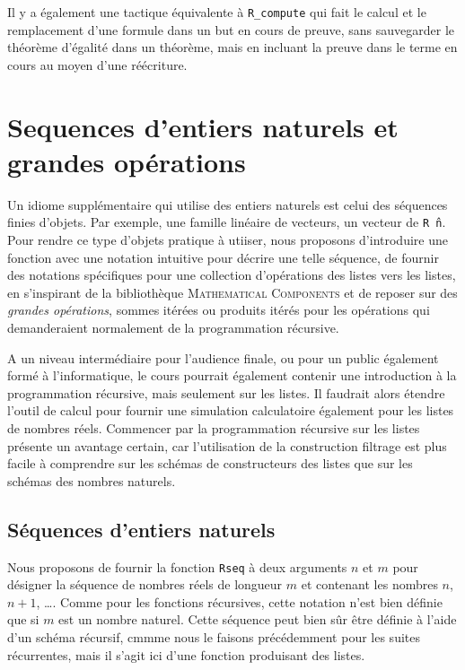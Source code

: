 \documentclass[draft]{jflart}
\newcommand{\mathcomp}{\textsc{Mathematical Components}}
\begin{document}
Il y a également une tactique équivalente à \texttt{R\_compute} qui fait
le calcul et le remplacement d'une formule dans un but en cours de
preuve, sans sauvegarder le théorème d'égalité dans un théorème, mais
en incluant la preuve dans le terme en cours au moyen d'une réécriture.

\section{Sequences d'entiers naturels et grandes opérations}
Un idiome supplémentaire qui utilise des entiers naturels est celui
des séquences finies d'objets.  Par exemple, une famille linéaire de
vecteurs, un vecteur de \texttt{R \^ n}.  Pour rendre ce type d'objets
pratique à utiiser, nous proposons d'introduire une fonction avec
une notation intuitive pour décrire une telle séquence, de fournir
des notations spécifiques pour une collection d'opérations des listes
vers les listes, en s'inspirant de la bibliothèque \mathcomp{} et
de reposer sur des {\em grandes opérations}, sommes itérées ou
produits itérés pour les opérations qui demanderaient normalement de
la programmation récursive.

A un niveau intermédiaire pour l'audience finale, ou pour un public
également formé à l'informatique, le cours pourrait également contenir
une introduction à la programmation récursive, mais seulement sur les
listes.  Il faudrait alors étendre l'outil de calcul pour fournir une
simulation calculatoire également pour les listes de nombres réels.
Commencer par la programmation récursive sur les listes présente un
avantage certain, car l'utilisation de la construction filtrage est
plus facile à comprendre sur les schémas de constructeurs des listes
que sur les schémas des nombres naturels.

\subsection{Séquences d'entiers naturels}
Nous proposons de fournir la fonction \texttt{Rseq} à deux arguments
\(n\) et \(m\)
pour désigner la séquence de nombres réels de longueur \(m\) et
contenant les nombres \(n\), \(n + 1\), \dots.
Comme pour les fonctions récursives, cette notation
n'est bien définie que si \(m\) est un nombre naturel.  Cette séquence
peut bien sûr être définie à l'aide d'un schéma récursif, cmmme nous le
faisons précédemment pour les suites récurrentes, mais il s'agit ici
d'une fonction produisant des listes.
\end{document}
